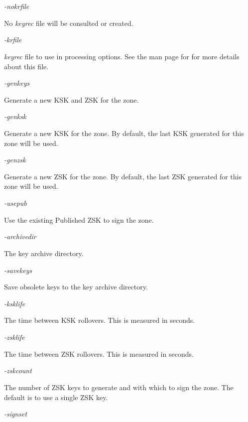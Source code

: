 \begin{description}

\item {\it -nokrfile}\verb" "

No {\it keyrec} file will be consulted or created.

\item {\it -krfile}\verb" "

{\it keyrec} file to use in processing options.  See the man page for
 for more details about this file.

\item {\it -genkeys}\verb" "

Generate a new KSK and ZSK for the zone.

\item {\it -genksk}\verb" "

Generate a new KSK for the zone.  By default, the last KSK generated for this
zone will be used.

\item {\it -genzsk}\verb" "

Generate a new ZSK for the zone.  By default, the last ZSK generated for this
zone will be used.

\item {\it -usepub}\verb" "

Use the existing Published ZSK to sign the zone.

\item {\it -archivedir}\verb" "

The key archive directory.

\item {\it -savekeys}\verb" "

Save obsolete keys to the key archive directory.

\item {\it -ksklife}\verb" "

The time between KSK rollovers.  This is measured in seconds.

\item {\it -zsklife}\verb" "

The time between ZSK rollovers.  This is measured in seconds.

\item {\it -zskcount}\verb" "

The number of ZSK keys to generate and with which to sign the zone.  The
default is to use a single ZSK key.

\item {\it -signset}\verb" "


\end{description}
